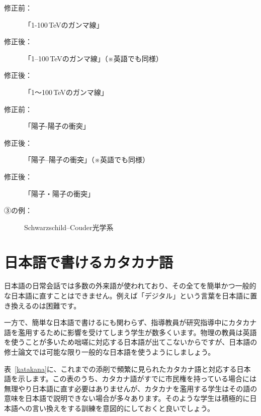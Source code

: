 \begin{description}
\item[修正前：]「1-100\,TeVのガンマ線」
\item[修正後：]「1--100\,TeVのガンマ線」（※英語でも同様）
\item[修正後：]「1〜100\,TeVのガンマ線」
\end{description}

\begin{description}
\item[修正前：]「陽子-陽子の衝突」
\item[修正後：]「陽子--陽子の衝突」（※英語でも同様）
\item[修正後：]「陽子・陽子の衝突」
\end{description}

\begin{description}
\item[③の例：]Schwarzschild--Couder光学系
\end{description}

\section{日本語で書けるカタカナ語}

日本語の日常会話では多数の外来語が使われており、その全てを簡単かつ一般的な日本語に直すことはできません。例えば「デジタル」という言葉を日本語に置き換えるのは困難です。

一方で、簡単な日本語で書けるにも関わらず、指導教員が研究指導中にカタカナ語を濫用するために影響を受けてしまう学生が数多くいます。物理の教員は英語を使うことが多いため咄嗟に対応する日本語が出てこないからですが、日本語の修士論文では可能な限り一般的な日本語を使うようにしましょう。

表~\ref{katakana}に、これまでの添削で頻繁に見られたカタカナ語と対応する日本語を示します。この表のうち、カタカナ語がすでに市民権を持っている場合には無理やり日本語に直す必要はありませんが、カタカナを濫用する学生はその語の意味を日本語で説明できない場合が多々あります。そのような学生は積極的に日本語への言い換えをする訓練を意図的にしておくと良いでしょう。


